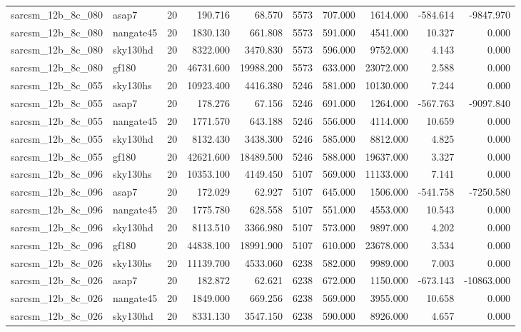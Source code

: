 \begin{tabular}{llrrrrrrrr}
sarcsm\_12b\_8c\_080 & asap7 & 20 & 190.716 & 68.570 & 5573 & 707.000 & 1614.000 & -584.614 & -9847.970 \\
sarcsm\_12b\_8c\_080 & nangate45 & 20 & 1830.130 & 661.808 & 5573 & 591.000 & 4541.000 & 10.327 & 0.000 \\
sarcsm\_12b\_8c\_080 & sky130hd & 20 & 8322.000 & 3470.830 & 5573 & 596.000 & 9752.000 & 4.143 & 0.000 \\
sarcsm\_12b\_8c\_080 & gf180 & 20 & 46731.600 & 19988.200 & 5573 & 633.000 & 23072.000 & 2.588 & 0.000 \\
sarcsm\_12b\_8c\_055 & sky130hs & 20 & 10923.400 & 4416.380 & 5246 & 581.000 & 10130.000 & 7.244 & 0.000 \\
sarcsm\_12b\_8c\_055 & asap7 & 20 & 178.276 & 67.156 & 5246 & 691.000 & 1264.000 & -567.763 & -9097.840 \\
sarcsm\_12b\_8c\_055 & nangate45 & 20 & 1771.570 & 643.188 & 5246 & 556.000 & 4114.000 & 10.659 & 0.000 \\
sarcsm\_12b\_8c\_055 & sky130hd & 20 & 8132.430 & 3438.300 & 5246 & 585.000 & 8812.000 & 4.825 & 0.000 \\
sarcsm\_12b\_8c\_055 & gf180 & 20 & 42621.600 & 18489.500 & 5246 & 588.000 & 19637.000 & 3.327 & 0.000 \\
sarcsm\_12b\_8c\_096 & sky130hs & 20 & 10353.100 & 4149.450 & 5107 & 569.000 & 11133.000 & 7.141 & 0.000 \\
sarcsm\_12b\_8c\_096 & asap7 & 20 & 172.029 & 62.927 & 5107 & 645.000 & 1506.000 & -541.758 & -7250.580 \\
sarcsm\_12b\_8c\_096 & nangate45 & 20 & 1775.780 & 628.558 & 5107 & 551.000 & 4553.000 & 10.543 & 0.000 \\
sarcsm\_12b\_8c\_096 & sky130hd & 20 & 8113.510 & 3366.980 & 5107 & 573.000 & 9897.000 & 4.202 & 0.000 \\
sarcsm\_12b\_8c\_096 & gf180 & 20 & 44838.100 & 18991.900 & 5107 & 610.000 & 23678.000 & 3.534 & 0.000 \\
sarcsm\_12b\_8c\_026 & sky130hs & 20 & 11139.700 & 4533.060 & 6238 & 582.000 & 9989.000 & 7.003 & 0.000 \\
sarcsm\_12b\_8c\_026 & asap7 & 20 & 182.872 & 62.621 & 6238 & 672.000 & 1150.000 & -673.143 & -10863.000 \\
sarcsm\_12b\_8c\_026 & nangate45 & 20 & 1849.000 & 669.256 & 6238 & 569.000 & 3955.000 & 10.658 & 0.000 \\
sarcsm\_12b\_8c\_026 & sky130hd & 20 & 8331.130 & 3547.150 & 6238 & 590.000 & 8926.000 & 4.657 & 0.000 \\

\end{tabular}
